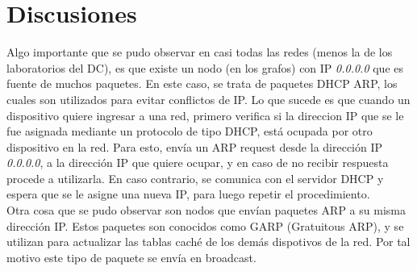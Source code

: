 \section{Discusiones}

Algo importante que se pudo observar en casi todas las redes (menos la de los laboratorios del DC), es que existe un nodo (en los grafos) con IP \textit{0.0.0.0} que es fuente de muchos paquetes. En este caso, se trata de paquetes DHCP ARP, los cuales son utilizados para evitar conflictos de IP. Lo que sucede es que cuando un dispositivo quiere ingresar a una red, primero verifica si la direccion IP que se le fue asignada mediante un protocolo de tipo DHCP, está ocupada por otro dispositivo en la red. Para esto, envía un ARP request desde la dirección IP \textit{0.0.0.0}, a la dirección IP que quiere ocupar, y en caso de no recibir respuesta procede a utilizarla. En caso contrario, se comunica con el servidor DHCP y espera que se le asigne una nueva IP, para luego repetir el procedimiento.\\

Otra cosa que se pudo observar son nodos que envían paquetes ARP a su misma dirección IP. Estos paquetes son conocidos como GARP (Gratuitous ARP), y se utilizan para actualizar las tablas caché de los demás dispotivos de la red. Por tal motivo este tipo de paquete se envía en broadcast.
